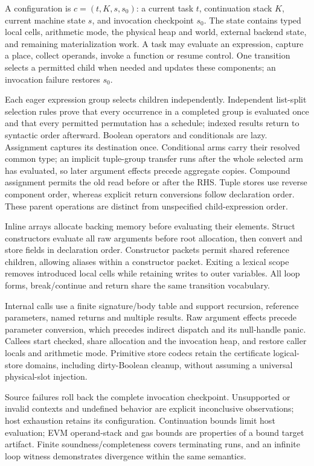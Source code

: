 \documentclass[conference]{IEEEtran}
\begin{document}
A configuration is $c=(t,K,s,s_0)$: a current task $t$, continuation stack
$K$, current machine state $s$, and invocation checkpoint $s_0$. The state
contains typed local cells, arithmetic mode, the physical heap and world,
external backend state, and remaining materialization work. A task may evaluate
an expression, capture a place, collect operands, invoke a function or resume
control. One transition selects a permitted child when needed and updates
these components; an invocation failure restores $s_0$.

Each eager expression group selects children independently. Independent
list-split selection rules prove that every occurrence in a completed group is evaluated once and
that every permitted permutation has a schedule; indexed results return to
syntactic order afterward. Boolean operators and conditionals are lazy.
Assignment captures its destination once. Conditional arms carry their
resolved common type; an implicit tuple-group transfer runs after the whole
selected arm has evaluated, so later argument effects precede aggregate copies.
Compound assignment permits the old read before or after the RHS. Tuple stores use reverse component order, whereas
explicit return conversions follow declaration order. These parent operations
are distinct from unspecified child-expression order.

Inline arrays allocate backing memory before evaluating their elements. Struct constructors
evaluate all raw arguments before root allocation, then convert and store
fields in declaration order. Constructor packets permit shared reference
children, allowing aliases within a constructor packet. Exiting a lexical scope
removes introduced local cells while retaining writes to outer variables.
All loop forms, break/continue and return share the same transition vocabulary.

Internal calls use a finite signature/body table and support recursion,
reference parameters, named returns and multiple results. Raw argument effects
precede parameter conversion, which precedes indirect dispatch and its
null-handle panic. Callees start checked, share allocation and the invocation
heap, and restore caller locals and arithmetic mode. Primitive store codecs
retain the certificate logical-store domains, including dirty-Boolean cleanup,
without assuming a universal physical-slot injection.

Source failures roll back the complete invocation checkpoint. Unsupported or
invalid contexts and undefined behavior are explicit inconclusive observations;
host exhaustion retains its configuration. Continuation bounds limit host
evaluation; EVM operand-stack and gas bounds are properties of a bound target
artifact. Finite soundness/completeness covers terminating runs, and an infinite
loop witness demonstrates divergence within the same semantics.
\end{document}
